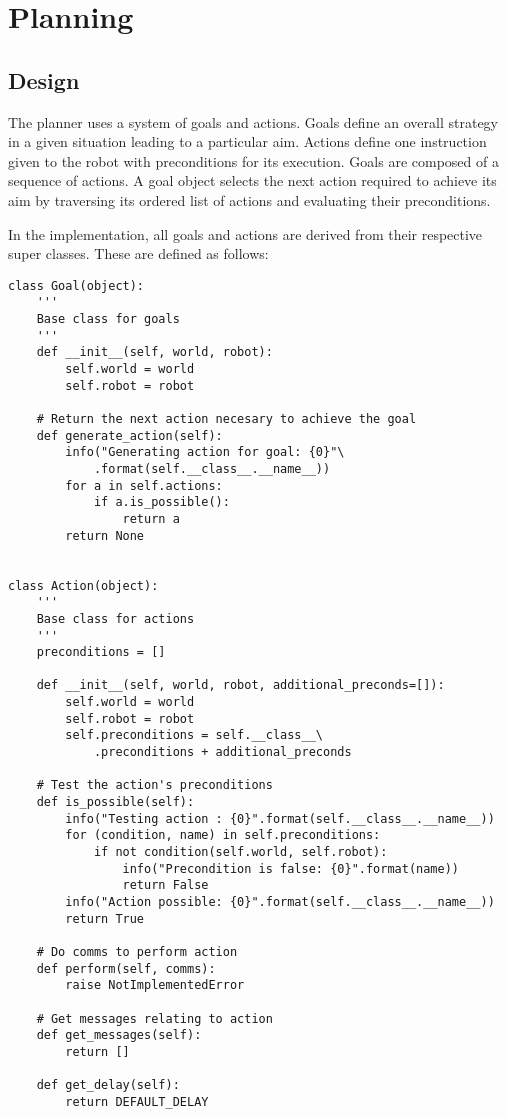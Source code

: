 \section{Planning}

\subsection{Design}

The planner uses a system of goals and actions. Goals define an overall strategy in a given situation leading to a particular aim. Actions define one instruction given to the robot with preconditions for its execution. Goals are composed of a sequence of actions. A goal object selects the next action required to achieve its aim by traversing its ordered list of actions and evaluating their preconditions.

In the implementation, all goals and actions are derived from their respective super classes. These are defined as follows:

\begin{lstlisting}
class Goal(object):
    '''
    Base class for goals
    '''
    def __init__(self, world, robot):
        self.world = world
        self.robot = robot

    # Return the next action necesary to achieve the goal
    def generate_action(self):
        info("Generating action for goal: {0}"\
        	.format(self.__class__.__name__))
        for a in self.actions:
            if a.is_possible():
                return a
        return None


class Action(object):
    '''
    Base class for actions
    '''
    preconditions = []

    def __init__(self, world, robot, additional_preconds=[]):
        self.world = world
        self.robot = robot
        self.preconditions = self.__class__\
        	.preconditions + additional_preconds

    # Test the action's preconditions
    def is_possible(self):
        info("Testing action : {0}".format(self.__class__.__name__))
        for (condition, name) in self.preconditions:
            if not condition(self.world, self.robot):
                info("Precondition is false: {0}".format(name))
                return False
        info("Action possible: {0}".format(self.__class__.__name__))
        return True

    # Do comms to perform action
    def perform(self, comms):
        raise NotImplementedError

    # Get messages relating to action
    def get_messages(self):
        return []

    def get_delay(self):
        return DEFAULT_DELAY

\end{lstlisting}

